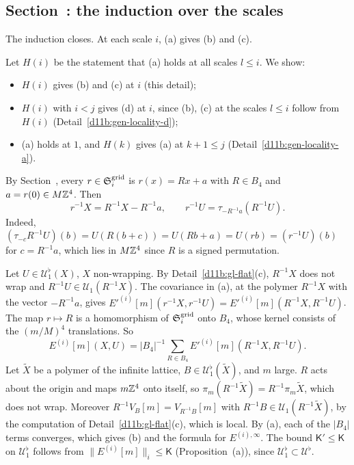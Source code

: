 \subsection{Section~\texorpdfstring{}{59}: the induction over the scales}\label{d11b:59e}

\begin{detail}\label{d11b:gen-locality-bc}
The induction closes. At each scale $i$, (a) gives (b) and (c).
\end{detail}

\begin{step}
Let $H(i)$ be the statement that (a) holds at all scales $l\le i$. We show:
\begin{itemize}
\item $H(i)$ gives (b) and (c) at $i$ (this detail);
\item $H(i)$ with $i<j$ gives (d) at $i$, since (b), (c) at the scales $l\le i$ follow from $H(i)$ (Detail~\ref{d11b:gen-locality-d});
\item (a) holds at $1$, and $H(k)$ gives (a) at $k+1\le j$ (Detail~\ref{d11b:gen-locality-a}).
\end{itemize}
\end{step}

\begin{step}[(a)$\Rightarrow$(b)]
By Section~, every $r\in\mathfrak S^{\rm grid}_i$ is $r(x)=Rx+a$ with $R\in B_4$ and $a=r(0)\in M\mathbb Z^4$. Then
\[
r^{-1}X=R^{-1}X-R^{-1}a,\qquad r^{-1}U=\tau_{-R^{-1}a}(R^{-1}U).
\]
Indeed, $(\tau_{-c}R^{-1}U)(b)=U(R(b+c))=U(Rb+a)=U(rb)=(r^{-1}U)(b)$ for $c=R^{-1}a$, which lies in $M\mathbb Z^4$ since $R$ is a signed permutation.

Let $U\in\mathcal U^\flat_1(X)$, $X$ non-wrapping. By Detail~\ref{d11b:gl-flat}(c), $R^{-1}X$ does not wrap and $R^{-1}U\in\mathcal U_1(R^{-1}X)$. The covariance in (a), at the polymer $R^{-1}X$ with the vector $-R^{-1}a$, gives $E'^{(i)}[m](r^{-1}X,r^{-1}U)=E'^{(i)}[m](R^{-1}X,R^{-1}U)$. The map $r\mapsto R$ is a homomorphism of $\mathfrak S^{\rm grid}_i$ onto $B_4$, whose kernel consists of the $(m/M)^4$ translations. So
\[
E^{(i)}[m](X,U)=|B_4|^{-1}\sum_{R\in B_4}E'^{(i)}[m](R^{-1}X,R^{-1}U).
\]
Let $\tilde X$ be a polymer of the infinite lattice, $B\in\mathcal U^\flat_1(\tilde X)$, and $m$ large. $R$ acts about the origin and maps $m\mathbb Z^4$ onto itself, so $\pi_m(R^{-1}\tilde X)=R^{-1}\pi_m\tilde X$, which does not wrap. Moreover $R^{-1}V_B[m]=V_{R^{-1}B}[m]$ with $R^{-1}B\in\mathcal U_1(R^{-1}\tilde X)$, by the computation of Detail~\ref{d11b:gl-flat}(c), which is local. By (a), each of the $|B_4|$ terms converges, which gives (b) and the formula for $E^{(i),\infty}$. The bound $\mathsf K'\le\mathsf K$ on $\mathcal U^\flat_1$ follows from $\|E^{(i)}[m]\|_i\le\mathsf K$ (Proposition~(a)), since $\mathcal U^\flat_1\subset\mathcal U^\flat$.
\end{step}

